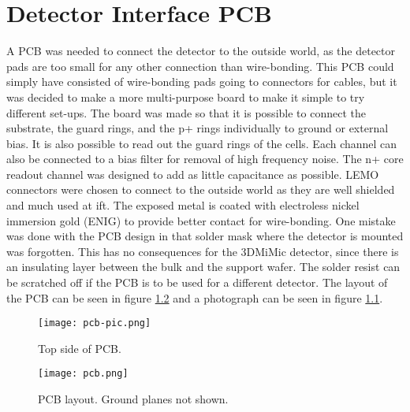 \documentclass[../main/thesis.tex]{subfiles}
\begin{document}
\chapter{Detector Interface PCB}
\label{a-pcb}

A \gls{PCB} was needed to connect the detector to the outside world, as the detector pads are too small for any other connection than wire-bonding. This \gls{PCB} could simply have consisted of wire-bonding pads going to connectors for cables, but it was decided to make a more multi-purpose board to make it simple to try different set-ups. The board was made so that it is possible to connect the substrate, the guard rings, and the p+ rings individually to ground or external bias. It is also possible to read out the guard rings of the cells. Each channel can also be connected to a bias filter for removal of high frequency noise. The n+ core readout channel was designed to add as little capacitance as possible. LEMO connectors were chosen to connect to the outside world as they are well shielded and much used at \gls{ift}. The exposed metal is coated with electroless nickel immersion gold (ENIG) to provide better contact for wire-bonding. One mistake was done with the \gls{PCB} design in that solder mask where the detector is mounted was forgotten. This has no consequences for the 3DMiMic detector, since there is an insulating layer between the bulk and the support wafer. The solder resist can be scratched off if the \gls{PCB} is to be used for a different detector. The layout of the \gls{PCB} can be seen in figure \ref{fig-pcb} and a photograph can be seen in figure \ref{fig-pcb-pic}. 

\begin{figure}[h]
	\centering
	\texttt{[image: pcb-pic.png]}
	\caption{Top side of PCB.}
	\label{fig-pcb-pic} 
\end{figure}

\begin{figure}%
	\centering
	\texttt{[image: pcb.png]}
	\caption{PCB layout. Ground planes not shown.}
	\label{fig-pcb} 
\end{figure}
\end{document}
